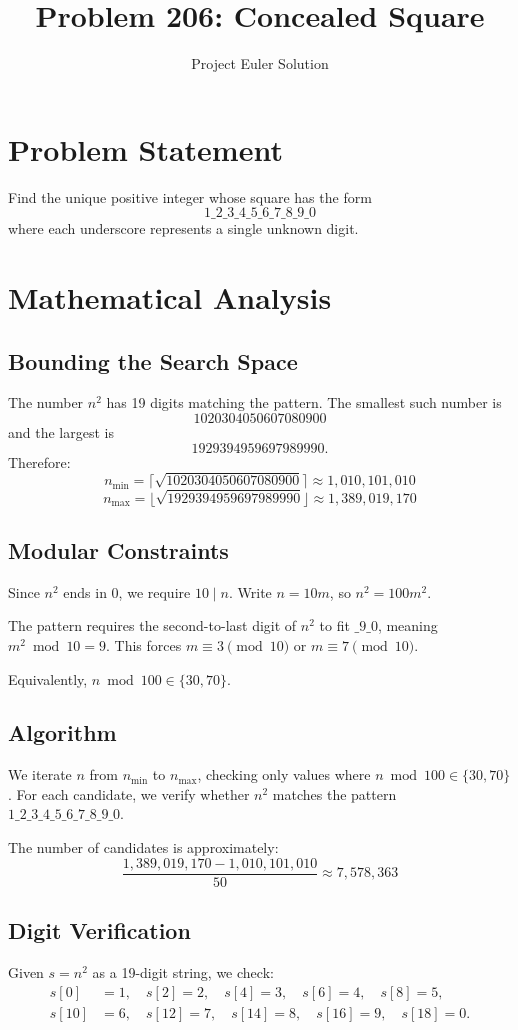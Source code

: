 \documentclass[12pt]{article}
\title{Problem 206: Concealed Square}
\author{Project Euler Solution}
\date{}
\begin{document}
\maketitle

\section{Problem Statement}
Find the unique positive integer whose square has the form
\[
1\_2\_3\_4\_5\_6\_7\_8\_9\_0
\]
where each underscore represents a single unknown digit.

\section{Mathematical Analysis}

\subsection{Bounding the Search Space}
The number $n^2$ has 19 digits matching the pattern. The smallest such number is
\[
1020304050607080900
\]
and the largest is
\[
1929394959697989990.
\]
Therefore:
\[
n_{\min} = \lceil \sqrt{1020304050607080900} \rceil \approx 1{,}010{,}101{,}010
\]
\[
n_{\max} = \lfloor \sqrt{1929394959697989990} \rfloor \approx 1{,}389{,}019{,}170
\]

\subsection{Modular Constraints}
Since $n^2$ ends in 0, we require $10 \mid n$. Write $n = 10m$, so $n^2 = 100m^2$.

The pattern requires the second-to-last digit of $n^2$ to fit $\_9\_0$, meaning $m^2 \bmod 10 = 9$. This forces $m \equiv 3 \pmod{10}$ or $m \equiv 7 \pmod{10}$.

Equivalently, $n \bmod 100 \in \{30, 70\}$.

\subsection{Algorithm}
We iterate $n$ from $n_{\min}$ to $n_{\max}$, checking only values where $n \bmod 100 \in \{30, 70\}$. For each candidate, we verify whether $n^2$ matches the pattern $1\_2\_3\_4\_5\_6\_7\_8\_9\_0$.

The number of candidates is approximately:
\[
\frac{1{,}389{,}019{,}170 - 1{,}010{,}101{,}010}{50} \approx 7{,}578{,}363
\]

\subsection{Digit Verification}
Given $s = n^2$ as a 19-digit string, we check:
\begin{align}
s[0] &= 1, \quad s[2] = 2, \quad s[4] = 3, \quad s[6] = 4, \quad s[8] = 5, \\
s[10] &= 6, \quad s[12] = 7, \quad s[14] = 8, \quad s[16] = 9, \quad s[18] = 0.
\end{align}
\end{document}
